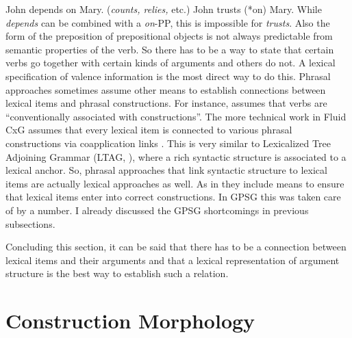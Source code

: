 \documentclass[output=paper]{langsci/langscibook}
\begin{document}
\eal\label{depends-on-ex}
\ex John depends on Mary.  (\emph{counts, relies,} etc.)
\ex John trusts (*on) Mary.  
\zl
While \emph{depends} can be combined with a \emph{on}-PP, this is impossible for \emph{trusts}. Also
the form of the preposition of prepositional objects is not always predictable from semantic
properties of the verb. So there has to be a way to state that certain verbs go together with
certain kinds of arguments and others do not. A lexical specification of valence information is the
most direct way to do this. Phrasal approaches sometimes assume other means to establish connections
between lexical items and phrasal constructions. For instance, \citet[]{Goldberg95a} assumes
that verbs are ``conventionally associated with constructions''. The more technical work in Fluid
CxG assumes that every lexical item is connected to various phrasal constructions via coapplication
links \citep[]{vanTrijp2011a}. This is very similar to Lexicalized Tree Adjoining
Grammar
(LTAG, \citealt*{SAJ88a-u}), where a rich syntactic structure is associated to a lexical anchor. So,
phrasal approaches that link syntactic structure to lexical items are actually lexical
approaches as well. As in \gpsg they include means to ensure that lexical items enter into correct
constructions. In GPSG this was taken care of by a number. I already discussed the GPSG shortcomings
in previous subsections.

Concluding this section, it can be said that there has to be a connection between lexical items and
their arguments and that a lexical representation of argument structure is the best way to establish
such a relation.


\section{Construction Morphology}
\label{sec-cxg-morphology}
\end{document}
